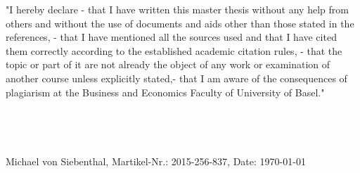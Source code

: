   "I hereby declare - that I have written this master thesis without any help 
  from others and without the use of documents and aids other than those stated 
  in the references, - that I have mentioned all the sources used and that I 
  have cited them correctly according to the established academic citation rules, 
  - that the topic or part of it are not already the object of any work or 
  examination of another course unless explicitly stated,- that I am aware of 
  the consequences of plagiarism at the Business and Economics Faculty of University of Basel."\\\\\\\\\\
  Michael von Siebenthal, Martikel-Nr.: 2015-256-837, Date: \today
